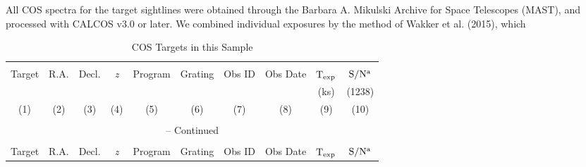 All COS spectra for the target sightlines were obtained through the Barbara A. Mikulski Archive for Space Telescopes (MAST), and processed with CALCOS v3.0 or later. We combined individual exposures by the method of Wakker et al. (2015), which
\begin{landscape}

\renewcommand{\thefootnote}{\alph{footnote}}

\scriptsize
\begin{center}
\begin{longtable}{l l l l l l l l l l}
\caption[Pilot Sample: COS Targets]{COS Targets in this Sample} \label{table1} \\

\hline \hline \\[-2ex]
  \multicolumn{1}{c}{Target} & 
  \multicolumn{1}{c}{R.A.} &
  \multicolumn{1}{c}{Decl.} &
  \multicolumn{1}{c}{\textit{z}} &
  \multicolumn{1}{c}{Program} &
  \multicolumn{1}{c}{Grating} &
  \multicolumn{1}{c}{Obs ID} &
  \multicolumn{1}{c}{Obs Date} &
  \multicolumn{1}{c}{$\rm T_{exp}$\tablenotemark{a}} &
  \multicolumn{1}{c}{$\rm S/N^a$}  \\
  
  \multicolumn{1}{c}{} & 
  \multicolumn{1}{c}{} &
  \multicolumn{1}{c}{} &
  \multicolumn{1}{c}{} &
  \multicolumn{1}{c}{} &
  \multicolumn{1}{c}{} &
  \multicolumn{1}{c}{} &
  \multicolumn{1}{c}{} &
  \multicolumn{1}{c}{(ks)} &
  \multicolumn{1}{c}{(1238)} \\
  
  \multicolumn{1}{c}{(1)} & 
  \multicolumn{1}{c}{(2)} &
  \multicolumn{1}{c}{(3)} &
  \multicolumn{1}{c}{(4)} &
  \multicolumn{1}{c}{(5)} &
  \multicolumn{1}{c}{(6)} &
  \multicolumn{1}{c}{(7)} &
  \multicolumn{1}{c}{(8)} &
  \multicolumn{1}{c}{(9)} &
  \multicolumn{1}{c}{(10)} \\[0.5ex] \hline \\[-1.8ex]
\endfirsthead

\multicolumn{10}{c}{{\tablename} \thetable{} -- Continued} \\[0.5ex]
\hline \hline \\[-2ex]
  \multicolumn{1}{c}{Target} & 
  \multicolumn{1}{c}{R.A.} &
  \multicolumn{1}{c}{Decl.} &
  \multicolumn{1}{c}{\textit{z}} &
  \multicolumn{1}{c}{Program} &
  \multicolumn{1}{c}{Grating} &
  \multicolumn{1}{c}{Obs ID} &
  \multicolumn{1}{c}{Obs Date} &
  \multicolumn{1}{c}{$\rm T_{exp}$\tablenotemark{a}} &
  \multicolumn{1}{c}{$\rm S/N^a$}  \\
  

\end{longtable}
\end{center}
\end{landscape}

